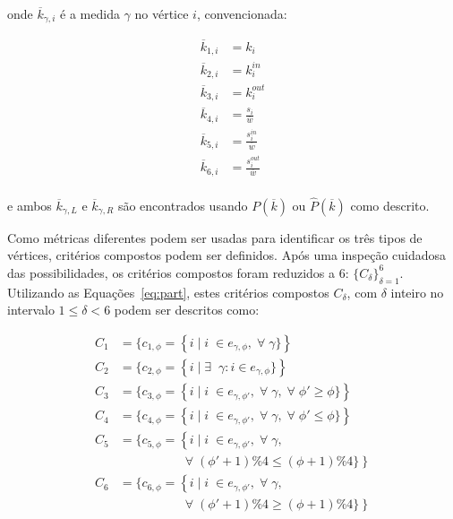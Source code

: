 \documentclass[a4paper,openright,12pt]{report} %
\begin{document}
\noindent onde $\overline{k}_{\gamma,i}$ é a medida $\gamma$ no vértice $i$,
convencionada:

\begin{equation}
    \begin{split}
        \overline{k}_{1,i}&=k_i \\
        \overline{k}_{2,i}&=k_i^{in} \\
        \overline{k}_{3,i}&=k_i^{out} \\
        \overline{k}_{4,i}&=\frac{s_i}{\overline{w}} \\
        \overline{k}_{5,i}&=\frac{s_i^{in}}{\overline{w}} \\
        \overline{k}_{6,i}&=\frac{s_i^{out}}{\overline{w}} \\
    \end{split}
\end{equation}

\noindent e ambos $\overline{k}_{\gamma,L}$ e $\overline{k}_{\gamma,R}$ são encontrados  usando
$P(\overline{k})$ ou $\hat{P}(\overline{k})$
como descrito.

Como métricas diferentes podem ser usadas para identificar
os três tipos de vértices, critérios compostos podem ser
definidos. Após uma inspeção cuidadosa das possibilidades,
os critérios compostos foram reduzidos a 6: $\{C_\delta\}_{\delta=1}^{6}$.
Utilizando as Equações~\ref{eq:part}, estes critérios compostos $C_\delta$, com $\delta$ inteiro no intervalo $1\leq\delta<6$ podem ser descritos como:

\begin{equation}
    \begin{split}
        C_1&=\{c_{1,\phi}=\left\{i\mid i\;\in e_{\gamma,\phi}, \;\forall\; \gamma\}\right\} \\
        C_2&=\{c_{2,\phi}=\left\{i\mid \exists \;\;\gamma: i \in e_{\gamma,\phi}\}\right\} \\
        C_3&=\{c_{3,\phi}=\left\{i\mid i\;\in e_{\gamma,\phi'}, \;\forall\; \gamma,\;\forall\;\phi'\geq \phi\}\right\} \\
        C_4&=\{c_{4,\phi}=\left\{i\mid i\;\in e_{\gamma,\phi'}, \;\forall\; \gamma,\;\forall\;\phi'\leq \phi\}\right\} \\
        C_5&=\{c_{5,\phi}=\left\{i\mid i\;\in e_{\gamma,\phi'}, \;\forall\; \gamma,\right.\\
                                                                                                                                    &\;\;\;\;\;\;\;\;\;\;\;\;\;\;\;\;\;\; \left.\;\forall\;(\phi'+1)\%4\leq (\phi+1)\%4\}\right\} \\
        C_6&=\{c_{6,\phi}=\left\{i\mid i\;\in e_{\gamma,\phi'}, \;\forall\; \gamma,\right.\\
                                                                                                                                    &\;\;\;\;\;\;\;\;\;\;\;\;\;\;\;\;\;\; \left.\;\forall\;(\phi'+1)\%4\geq (\phi+1)\%4\}\right\} \\
    \end{split}
\end{equation}
\end{document}
